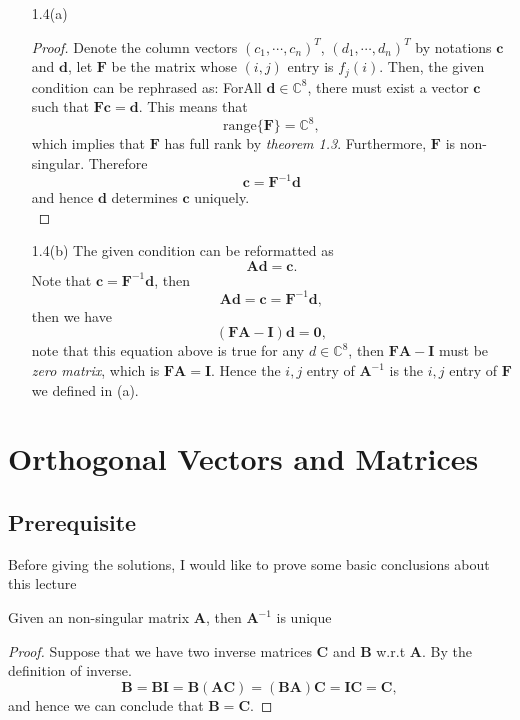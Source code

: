 \begin{enumerate}
    \item[1.4(a)] {
    \begin{proof}
    Denote the column vectors $(c_1, \cdots, c_n)^{T}$, $(d_1, \cdots, d_n)^{T}$ by notations $\bm{c}$ and $\bm{d}$, let $\bm{F}$ be the matrix whose $(i,j)$ entry is $f_j(i)$. Then, the given condition can be rephrased as: ForAll $\bm{d} \in \mathbb{C}^8$, there must exist a vector $\bm{c}$ such that $\bm{F} \bm{c} = \bm{d}$. This means that 
    $$
    \mathrm{range} \{\bm{F} \} = \mathbb{C}^8, 
    $$ 
    which implies that $\bm{F}$ has full rank by \textit{theorem 1.3}. Furthermore, $\mathbf{F}$ is non-singular. Therefore
    \[ \bm{c} = \bm{F}^{-1} \bm{d}\]
    and hence $\bm{d}$ determines $\bm{c}$ uniquely.\\
    \end{proof}
    }
    \item[1.4(b)]{
    The given condition can be reformatted as
    $$
    \bm{A} \bm{d} = \bm{c}.
    $$
    Note that $\bm{c} = \bm{F}^{-1} \bm{d}$, then 
    $$
    \bm{A} \bm{d}  = \bm{c} = \bm{F}^{-1} \bm{d},
    $$
    then we have
    $$
    (\bm{FA} - \bm{I})\bm{d } = \bm{0}, 
    $$
    note that this equation above is true for any $d \in \mathbb{C}^{8}$, then $\bm{FA} - \bm{I}$ must be \textit{zero matrix}, which is $\bm{FA} = \bm{I}$. Hence the $i,j$ entry of $\bm{A}^{-1}$ is the $i,j$ entry of $\bm{F}$ we defined in (a).
    }
\end{enumerate}

    
   
    

\chapter{Orthogonal Vectors and Matrices}
    
    \section{Prerequisite}
    Before giving the solutions, I would like to prove some basic conclusions about this lecture
    \begin{lemma}
        Given an non-singular matrix $\bm{A}$, then $\bm{A}^{-1}$ is unique
        \begin{proof}
        Suppose that we have two inverse matrices $\bm{C}$ and $\bm{B}$ w.r.t $\bm{A}$. By the definition of inverse. 
        \[\bm{B} =\bm{BI} = \bm{B(AC)} = \bm{(BA)C} = \bm{IC} = \bm{C},\]
        and hence we can conclude that $\bm{B} = \bm{C}$.
        \end{proof}
        \label{lem:inv-unique}
    \end{lemma} 
    
